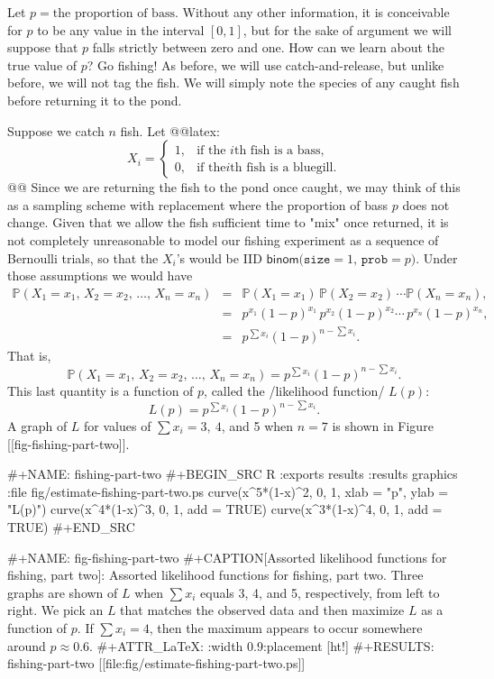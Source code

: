 Let \(p=\mbox{the proportion of bass}\). Without any other
information, it is conceivable for \(p\) to be any value in the
interval \([0,1]\), but for the sake of argument we will suppose that
\(p\) falls strictly between zero and one. How can we learn about the
true value of \(p\)? Go fishing! As before, we will use
catch-and-release, but unlike before, we will not tag the fish. We
will simply note the species of any caught fish before returning it to
the pond.

Suppose we catch \(n\) fish. Let @@latex:\[ X_{i} = \begin{cases} 1, &
\mbox{if the \(i\mathrm{th}\) fish is a bass,}\\ 0, & \mbox{if the
\(i\mathrm{th}\) fish is a bluegill.} \end{cases} \]@@ Since we are
returning the fish to the pond once caught, we may think of this as a
sampling scheme with replacement where the proportion of bass \(p\)
does not change. Given that we allow the fish sufficient time to "mix"
once returned, it is not completely unreasonable to model our fishing
experiment as a sequence of Bernoulli trials, so that the \(X_{i}\)'s
would be IID
\(\mathsf{binom(\mathtt{size}}=1,\,\mathtt{prob}=p)\). Under those
assumptions we would have
\begin{eqnarray*}
\mathbb{P}(X_{1}=x_{1},\, X_{2}=x_{2},\,\ldots,\, X_{n}=x_{n}) & = & \mathbb{P}(X_{1}=x_{1})\,\mathbb{P}(X_{2}=x_{2})\,\cdots\mathbb{P}(X_{n}=x_{n}),\\
 & = & p^{x_{1}}(1-p)^{x_{1}}\, p^{x_{2}}(1-p)^{x_{2}}\cdots\, p^{x_{n}}(1-p)^{x_{n}},\\
 & = & p^{\sum x_{i}}(1-p)^{n-\sum x_{i}}.
\end{eqnarray*}
That is, \[ \mathbb{P}(X_{1}=x_{1},\, X_{2}=x_{2},\,\ldots,\,
X_{n}=x_{n})=p^{\sum x_{i}}(1-p)^{n-\sum x_{i}}.  \] This last
quantity is a function of \(p\), called the /likelihood function/
\(L(p)\): \[ L(p)=p^{\sum x_{i}}(1-p)^{n-\sum x_{i}}.  \] A graph of
\(L\) for values of \(\sum x_{i}=3,\ 4\), and 5 when \(n=7\) is shown
in Figure [[fig-fishing-part-two]].

#+NAME: fishing-part-two
#+BEGIN_SRC R :exports results :results graphics :file fig/estimate-fishing-part-two.ps
curve(x^5*(1-x)^2, 0, 1, xlab = "p", ylab = "L(p)")
curve(x^4*(1-x)^3, 0, 1, add = TRUE)
curve(x^3*(1-x)^4, 0, 1, add = TRUE)
#+END_SRC

#+NAME: fig-fishing-part-two
#+CAPTION[Assorted likelihood functions for fishing, part two]: \small Assorted likelihood functions for fishing, part two.   Three graphs are shown of \(L\) when \(\sum x_{i}\) equals 3, 4, and 5, respectively, from left to right. We pick an \(L\) that matches the observed data and then maximize \(L\) as a function of \(p\). If \(\sum x_{i}=4\), then the maximum appears to occur somewhere around \(p \approx 0.6\).
#+ATTR_LaTeX: :width 0.9\textwidth :placement [ht!]
#+RESULTS: fishing-part-two
[[file:fig/estimate-fishing-part-two.ps]]


